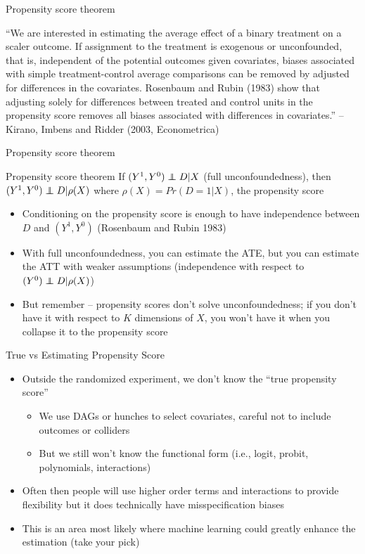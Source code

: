 \documentclass{beamer}
\newcommand\independent{\protect\mathpalette{\protect\independenT}{\perp}}
\def\independenT#1#2{\mathrel{\rlap{$#1#2$}\mkern2mu{#1#2}}}
\begin{document}
\begin{frame}{Propensity score theorem}

``We are interested in estimating the average effect of a binary treatment on a scaler outcome.  If assignment to the treatment is exogenous or unconfounded, that is, independent of the potential outcomes given covariates, biases associated with simple treatment-control average comparisons can be removed by adjusted for differences in the covariates.  Rosenbaum and Rubin (1983) show that adjusting solely for differences between treated and control units in the propensity score removes all biases associated with differences in covariates.'' -- Kirano, Imbens and Ridder (2003, Econometrica)

\end{frame}

\begin{frame}{Propensity score theorem}
	
	\begin{block}{Propensity score theorem}
	If $(Y^1,Y^0)\independent{D}|X$ (full unconfoundedness), then $(Y^1,Y^0)\independent{D} | \rho(X)$ where $\rho(X)=Pr(D=1|X)$, the propensity score
	\end{block}
	
	\begin{itemize}
	\item Conditioning on the propensity score is enough to have independence between $D$ and $(Y^1,Y^0)$ (Rosenbaum and Rubin 1983)
	\item With full unconfoundedness, you can estimate the ATE, but you can estimate the ATT with weaker assumptions (independence with respect to $(Y^0)\independent{D} | \rho(X)$)
	\item But remember -- propensity scores don't solve unconfoundedness; if you don't have it with respect to $K$ dimensions of $X$, you won't have it when you collapse it to the propensity score
	\end{itemize}
\end{frame}

\begin{frame}{True vs Estimating Propensity Score}


\begin{itemize}
\item Outside the randomized experiment, we don't know the ``true propensity score''
	\begin{itemize}
	\item We use DAGs or hunches to select covariates, careful not to include outcomes or colliders
	\item But we still won't know the functional form (i.e., logit, probit, polynomials, interactions)
	\end{itemize}
\item Often then people will use higher order terms and interactions to provide flexibility but it does technically have misspecification biases
\item This is an area most likely where machine learning could greatly enhance the estimation (take your pick)
\end{itemize}

\end{frame}
\end{document}
